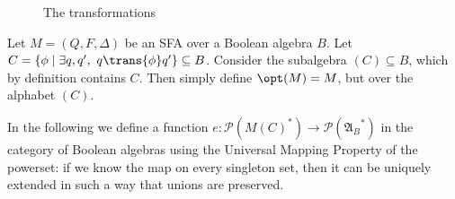\begin{figure}[H]
\caption{The transformations}
\label{diagram}
\begin{center}
\end{center}
\end{figure}

\begin{definition}
Let $M = (Q,F,\Delta)$ be an SFA over a Boolean algebra $B$. Let $C = \{ \phi \mid \exists q,q',~q \trans{\phi} q' \} \subseteq B$. Consider the subalgebra $(C) \subseteq B$, which by definition contains $C$. Then simply define $\opt(M) = M$, but over the alphabet $(C)$.
\end{definition}

In the following we define a function $e : \mathcal{P}(M(C)^*) \to \mathcal{P}({\mathfrak{A}_B}^*)$ in the category of Boolean algebras using the Universal Mapping Property of the powerset: if we know the map on every singleton set, then it can be uniquely extended in such a way that unions are preserved.

